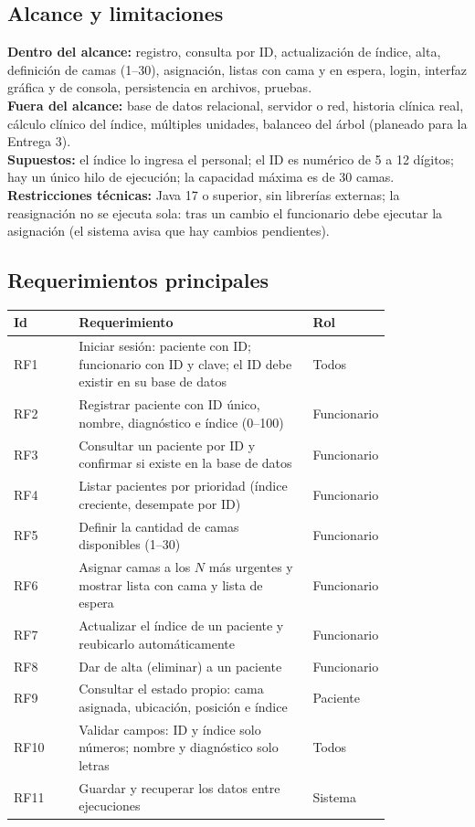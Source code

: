 \documentclass[11pt,a4paper]{article}
\begin{document}
\subsection{Alcance y limitaciones}
\textbf{Dentro del alcance:} registro, consulta por ID, actualización de índice, alta, definición de camas (1--30), asignación, listas con cama y en espera, login, interfaz gráfica y de consola, persistencia en archivos, pruebas.\\
\textbf{Fuera del alcance:} base de datos relacional, servidor o red, historia clínica real, cálculo clínico del índice, múltiples unidades, balanceo del árbol (planeado para la Entrega 3).\\
\textbf{Supuestos:} el índice lo ingresa el personal; el ID es numérico de 5 a 12 dígitos; hay un único hilo de ejecución; la capacidad máxima es de 30 camas.\\
\textbf{Restricciones técnicas:} Java 17 o superior, sin librerías externas; la reasignación no se ejecuta sola: tras un cambio el funcionario debe ejecutar la asignación (el sistema avisa que hay cambios pendientes).

\subsection{Requerimientos principales}
\begin{longtable}{@{}lp{0.62\linewidth}p{0.2\linewidth}@{}}
\toprule \textbf{Id} & \textbf{Requerimiento} & \textbf{Rol}\\ \midrule \endhead
RF1 & Iniciar sesión: paciente con ID; funcionario con ID y clave; el ID debe existir en su base de datos & Todos\\
RF2 & Registrar paciente con ID único, nombre, diagnóstico e índice (0--100) & Funcionario\\
RF3 & Consultar un paciente por ID y confirmar si existe en la base de datos & Funcionario\\
RF4 & Listar pacientes por prioridad (índice creciente, desempate por ID) & Funcionario\\
RF5 & Definir la cantidad de camas disponibles (1--30) & Funcionario\\
RF6 & Asignar camas a los $N$ más urgentes y mostrar lista con cama y lista de espera & Funcionario\\
RF7 & Actualizar el índice de un paciente y reubicarlo automáticamente & Funcionario\\
RF8 & Dar de alta (eliminar) a un paciente & Funcionario\\
RF9 & Consultar el estado propio: cama asignada, ubicación, posición e índice & Paciente\\
RF10 & Validar campos: ID y índice solo números; nombre y diagnóstico solo letras & Todos\\
RF11 & Guardar y recuperar los datos entre ejecuciones & Sistema\\
\bottomrule
\end{longtable}
\end{document}
